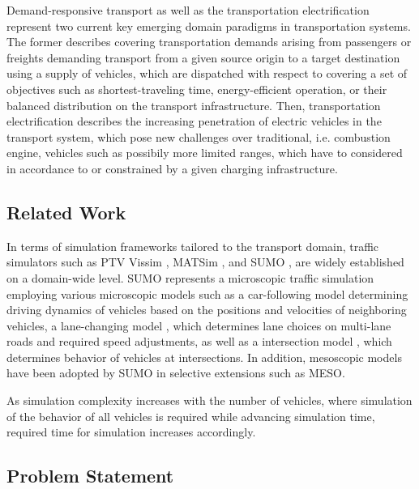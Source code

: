 \documentclass[graybox]{svmult}
\begin{document}
Demand-responsive transport \cite{brake_demand_2004} as well as the transportation electrification \cite{pereirinha2018main} represent two current key emerging domain paradigms in transportation systems. The former describes covering transportation demands arising from passengers or freights demanding transport from a given source origin to a target destination using a supply of vehicles, which are dispatched with respect to covering a set of objectives such as shortest-traveling time, energy-efficient operation, or their balanced distribution on the transport infrastructure. Then, transportation electrification describes the increasing penetration of electric vehicles in the transport system, which pose new challenges over traditional, i.e. combustion engine, vehicles such as possibily more limited ranges, which have to considered in accordance to or constrained by a given charging infrastructure. 
\vspace{-2mm}

\subsection{Related Work}
In terms of simulation frameworks tailored to the transport domain, traffic simulators such as PTV Vissim \cite{fellendorf_vissim_1994}, MATSim \cite{w_axhausen_multi-agent_2016}, and SUMO \cite{krajzewicz2010traffic}, \cite{lopez_microscopic_2018} are widely established on a domain-wide level. SUMO represents a microscopic traffic simulation employing various microscopic models such as a car-following model \cite{krauss1998microscopic} determining driving dynamics of vehicles based on the positions and velocities of neighboring vehicles, a lane-changing model \cite{erdmann2015sumo}, which determines lane choices on multi-lane roads and required speed adjustments, as well as a intersection model \cite{krajzewicz2013road}, which determines behavior of vehicles at intersections. In addition, mesoscopic models \cite{eissfeldt2004vehicle} have been adopted by SUMO in selective extensions such as MESO.

As simulation complexity increases with the number of vehicles, where simulation of the behavior of all vehicles is required while advancing simulation time, required time for simulation increases accordingly. 

\subsection{Problem Statement}
\end{document}
